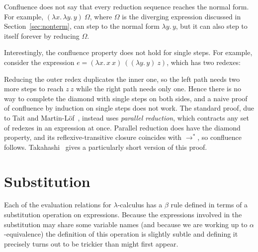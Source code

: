Confluence does not say that every reduction sequence reaches the normal form. For example,
$(\lambda x.\,\lambda y.\,y)\ \Omega$, where $\Omega$ is the diverging expression discussed in
Section~\ref{sec:nonterm}, can step to the normal form $\lambda y.\,y$, but it can also step to
itself forever by reducing $\Omega$.

Interestingly, the confluence property does not hold for single steps. For example, consider the
expression $e=(\lambda x.\,x\ x)\ ((\lambda y.\,y)\ z)$, which has two redexes:
\begin{center}
\end{center}
Reducing the outer redex duplicates the inner one, so the left path needs two more steps to reach
$z\ z$ while the right path needs only one. Hence there is no way to complete the diamond with
single steps on both sides, and a naive proof of confluence by induction on single steps does not
work. The standard proof, due to Tait and Martin-L\"of~\cite{barendregt}, instead uses
\emph{parallel reduction}, which contracts any set of redexes in an expression at once. Parallel
reduction does have the diamond property, and its reflexive-transitive closure coincides with
$\to^*$, so confluence follows. Takahashi~\cite{takahashi} gives a particularly short version of
this proof.

\section{Substitution}

Each of the evaluation relations for $\lambda$-calculus has a $\beta$ rule defined in terms of a
substitution operation on expressions. Because the expressions involved in the substitution may
share some variable names (and because we are working up to $\alpha$-equivalence) the definition of
this operation is slightly subtle and defining it precisely turns out to be trickier than might
first appear.

